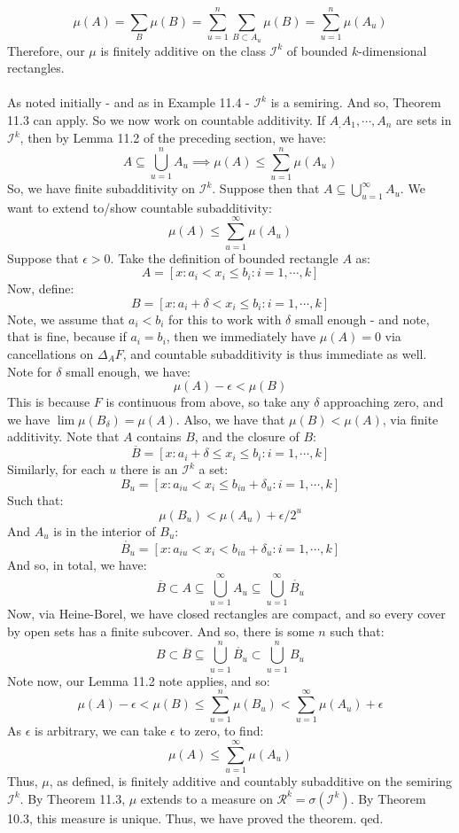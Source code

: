 \documentclass[12pt,a4paper]{article}
\newcommand{\1}[1]{\mathbbm{1}\left\{ #1 \right\}}
\newcommand{\ical}{\mathcal{I}}
\newcommand{\rcal}{\mathcal{R}}
\begin{document}
$$
	\mu(A) = \sum_B \mu(B) =
	\sum_{u=1}^n \sum_{B \subset A_u} \mu(B) =
	\sum_{u=1}^n \mu(A_u)
$$
Therefore, our $\mu$ is finitely additive on the class $\ical^k$ of bounded $k$-dimensional rectangles.
\\\\
As noted initially - and as in Example 11.4 - $\ical^k$ is a semiring. And so, Theorem 11.3 can apply. So we now work on countable additivity. If $A_,A_1,\cdots,A_n$ are sets in $\ical^k$, then by Lemma 11.2 of the preceding section, we have:
$$
	A \subseteq \bigcup_{u=1}^n A_u \implies
	\mu(A) \leq \sum_{u=1}^n \mu(A_u)
$$
So, we have finite subadditivity on $\ical^k$. Suppose then that $A \subseteq \bigcup_{u=1}^\infty A_u$. We want to extend to/show countable subadditivity:
$$
	\mu(A) \leq \sum_{u=1}^\infty \mu(A_u)
$$
Suppose that $\epsilon > 0$. Take the definition of bounded rectangle $A$ as:
$$
	A = \left[x: a_i < x_i \leq b_i : i = 1, \cdots, k\right]
$$
Now, define:
$$
	B = \left[x: a_i + \delta < x_i \leq b_i : i = 1, \cdots, k\right]
$$
Note, we assume that $a_i < b_i$ for this to work with $\delta$ small enough - and note, that is fine, because if $a_i = b_i$, then we immediately have $\mu(A) = 0$ via cancellations on $\Delta_A F$, and countable subadditivity is thus immediate as well. Note for $\delta$ small enough, we have:
$$
	\mu(A) - \epsilon < \mu(B)
$$
This is because $F$ is continuous from above, so take any $\delta$ approaching zero, and we have $\lim \mu(B_\delta) = \mu(A)$. Also, we have that $\mu(B) < \mu(A)$, via finite additivity. Note that $A$ contains $B$, and the closure of $B$:
$$
	\overline{B} = \left[x: a_i + \delta \leq x_i \leq b_i : i = 1, \cdots, k\right]
$$
Similarly, for each $u$ there is an $\ical^k$ a set:
$$
	B_u = \left[x: a_{iu} < x_i \leq b_{iu} + \delta_u : i = 1, \cdots, k\right]
$$
Such that:
$$
	\mu(B_u) < \mu(A_u) + \epsilon/2^u
$$
And $A_u$ is in the interior of $B_u$:
$$
	\mathring{B_u} = \left[x: a_{iu} < x_i < b_{iu} + \delta_u : i = 1, \cdots, k\right]
$$
And so, in total, we have:
$$
	\overline{B} \subset A \subseteq \bigcup_{u=1}^\infty A_u \subseteq \bigcup_{u=1}^\infty \mathring{B_u}
$$
Now, via Heine-Borel, we have closed rectangles are compact, and so every cover by open sets has a finite subcover. And so, there is some $n$ such that:
$$
	B \subset \overline{B} \subseteq \bigcup_{u=1}^n \mathring{B_u} \subset \bigcup_{u=1}^n B_u
$$
Note now, our Lemma 11.2 note applies, and so:
$$
	\mu(A) - \epsilon < \mu(B) \leq \sum_{u=1}^n \mu(B_u) < \sum_{u=1}^\infty \mu(A_u) + \epsilon
$$
As $\epsilon$ is arbitrary, we can take $\epsilon$ to zero, to find:
$$
	\mu(A) \leq \sum_{u=1}^\infty \mu(A_u)
$$
Thus, $\mu$, as defined, is finitely additive and countably subadditive on the semiring $\ical^k$. By Theorem 11.3, $\mu$ extends to a measure on $\rcal^k = \sigma(\ical^k)$. By Theorem 10.3, this measure is unique. Thus, we have proved the theorem. qed.
\end{document}
